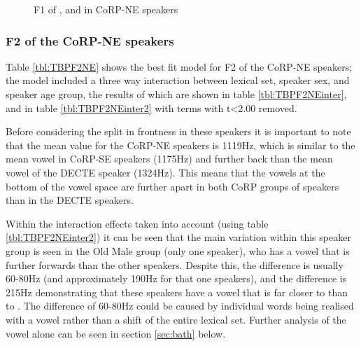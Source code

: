 \documentclass[../../00.FullDoc/tex/Thesis]{subfiles}
\begin{document}
\begin{figure}[h]
	
	\caption{F1 of \trap{}, \bath{} and \palm{} in CoRP-NE speakers} \label{fig:TF1NE}
\end{figure}

\subsubsection{F2 of the CoRP-NE speakers}
Table \ref{tbl:TBPF2NE}  shows the best fit model for F2 of the CoRP-NE speakers; the model included a three way interaction between lexical set, speaker sex, and speaker age group, the results of which are shown in table \ref{tbl:TBPF2NEinter}, and in table \ref{tbl:TBPF2NEinter2} with terms with t<2.00 removed.

Before considering the split in frontness in these speakers it is important to note that the mean \palm{} value for the CoRP-NE speakers is 1119Hz, which is similar to the mean \palm{} vowel in CoRP-SE speakers (1175Hz) and further back than the mean \palm{} vowel of the DECTE speaker (1324Hz). This means that the vowels at the bottom of the vowel space are further apart in both CoRP groups of speakers than in the DECTE speakers. 

Within the interaction effects taken into account (using table \ref{tbl:TBPF2NEinter2}) it can be seen that the main variation within this speaker group is seen in the Old Male group (only one speaker), who has a \trap{} vowel that is further forwards than the other speakers. Despite this, the \TB{} difference is usually 60-80Hz (and approximately 190Hz for that one speakers), and the \PB{} difference is 215Hz demonstrating that these speakers have a \bath{} vowel that is far closer to \trap{} than to \palm{}. The difference of 60-80Hz could be caused by individual \bath{} words being realised with a \palm{} vowel rather than a shift of the entire lexical set. Further analysis of the \bath{} vowel alone can be seen in section \ref{sec:bath} below.
\end{document}

